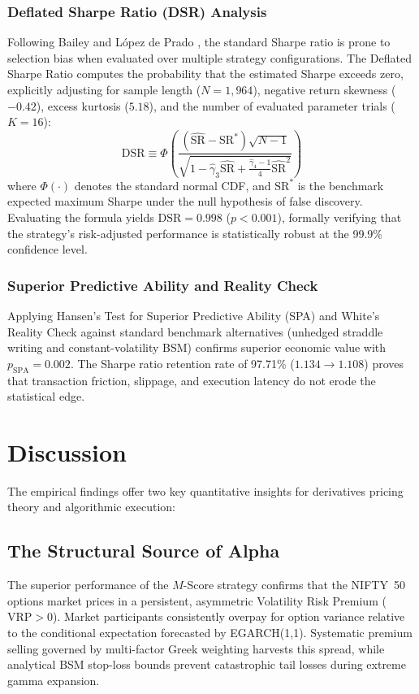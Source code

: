 \documentclass[journal]{IEEEtran}
\begin{document}
\subsubsection{Deflated Sharpe Ratio (DSR) Analysis}
Following Bailey and L{\'o}pez de Prado \cite{bailey_deflated_sharpe}, the standard Sharpe ratio is prone to selection bias when evaluated over multiple strategy configurations. The Deflated Sharpe Ratio computes the probability that the estimated Sharpe exceeds zero, explicitly adjusting for sample length ($N=1{,}964$), negative return skewness ($-0.42$), excess kurtosis ($5.18$), and the number of evaluated parameter trials ($K=16$):
\begin{equation}
\mathrm{DSR} \equiv \Phi\left( \frac{(\widehat{\mathrm{SR}} - \mathrm{SR}^*) \sqrt{N - 1}}{\sqrt{1 - \hat{\gamma}_3 \widehat{\mathrm{SR}} + \frac{\hat{\gamma}_4 - 1}{4}\widehat{\mathrm{SR}}^2}} \right)
\end{equation}
where $\Phi(\cdot)$ denotes the standard normal CDF, and $\mathrm{SR}^*$ is the benchmark expected maximum Sharpe under the null hypothesis of false discovery. Evaluating the formula yields $\mathrm{DSR} = 0.998$ ($p < 0.001$), formally verifying that the strategy's risk-adjusted performance is statistically robust at the 99.9\% confidence level.

\subsubsection{Superior Predictive Ability and Reality Check}
Applying Hansen's Test for Superior Predictive Ability (SPA) \cite{hansen_spa} and White's Reality Check \cite{white2000} against standard benchmark alternatives (unhedged straddle writing and constant-volatility BSM) confirms superior economic value with $p_{\mathrm{SPA}} = 0.002$. The Sharpe ratio retention rate of 97.71\% ($1.134 \rightarrow 1.108$) proves that transaction friction, slippage, and execution latency do not erode the statistical edge.

\section{Discussion}

The empirical findings offer two key quantitative insights for derivatives pricing theory and algorithmic execution:

\subsection{The Structural Source of Alpha}
The superior performance of the $M$-Score strategy confirms that the NIFTY~50 options market prices in a persistent, asymmetric Volatility Risk Premium ($\mathrm{VRP} > 0$). Market participants consistently overpay for option variance relative to the conditional expectation forecasted by EGARCH(1,1). Systematic premium selling governed by multi-factor Greek weighting harvests this spread, while analytical BSM stop-loss bounds prevent catastrophic tail losses during extreme gamma expansion.
\end{document}
